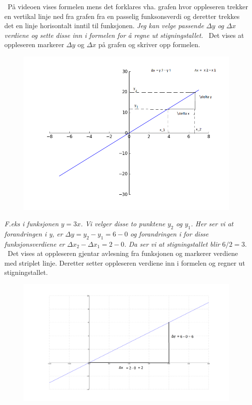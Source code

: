 \documentclass[12pt,twoside,onecolumn]{article}
\begin{document}
\newline
{\color{PineGreen} På videoen vises formelen mens det forklares vha. grafen hvor oppleseren trekker en vertikal linje ned fra grafen fra en passelig funksonsverdi og deretter trekkes det en linje horisontalt inntil til funksjonen.} \newline\newline
{\emph{\color{gray}
Jeg kan velge passende $\Delta y$ og $\Delta x$ verdiene og sette disse inn i formelen for å regne ut stigningstallet.}} \newline
{\color{PineGreen} Det vises at oppleseren markerer $\Delta y$ og $\Delta x$ på grafen og skriver opp formelen.} 
\begin{figure}[h!]
\centering
\includegraphics[scale = 0.4]{figures/stigningstallet.png}
\end{figure}
\newline\newline
{\emph{\color{gray}
F.eks i funksjonen $y = 3x$. Vi velger disse to punktene $y_2$ og $y_1$. Her ser vi at forandringen i y, er $\Delta y = y_2 - y_1 = 6- 0$ og forandringen i for disse funksjonsverdiene er $\Delta x_2 - \Delta x_1 = 2 - 0$. Da ser vi at stigningstallet blir $6/2 = 3.$}} \newline
{\color{PineGreen} Det vises at oppleseren gjentar avlesning fra funksjonen og markerer verdiene med striplet linje. Deretter setter oppleseren verdiene inn i formelen og regner ut stigningstallet.}
\begin{figure}[h!]
\centering
\includegraphics[scale = 0.3]{figures/stigningstalleksempelet.png}
\end{figure}
\end{document}
